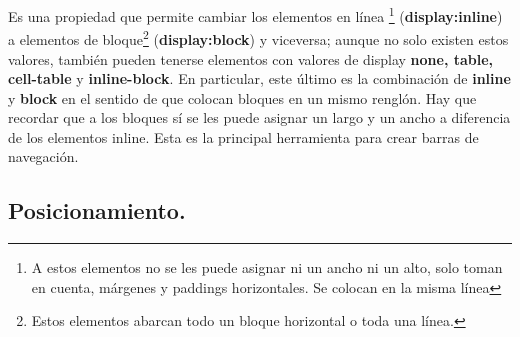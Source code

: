 \documentclass[10pt,oneside]{article}
\begin{document}
\begin{multicols}{2}
    Es una propiedad que permite cambiar los elementos en línea \footnote{A estos elementos no se les puede asignar ni un ancho ni un alto, solo toman en cuenta, márgenes y paddings horizontales. Se colocan en la misma línea} (\textbf{display:inline}) a elementos de bloque\footnote{Estos elementos abarcan todo un bloque horizontal o toda una línea.} (\textbf{display:block}) y viceversa; aunque no solo existen estos valores, también pueden tenerse elementos con valores de display  \textbf{none, table, cell-table} y \textbf{inline-block}. En particular, este último es la combinación de \textbf{inline} y \textbf{block} en el sentido de que colocan bloques en un mismo renglón. Hay que recordar que a los bloques sí se les puede asignar un largo y un ancho a diferencia de los elementos inline. Esta es la principal herramienta para crear barras de navegación. 

\subsection{Posicionamiento.}


\end{multicols}
\end{document}

